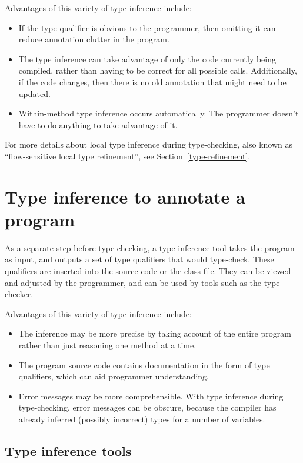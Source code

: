 Advantages of this variety of type inference include:
\begin{itemize}
\item
  If the type qualifier is obvious to the programmer, then omitting it
  can reduce annotation clutter in the program.
\item
  The type inference can take advantage of only the code currently being
  compiled, rather than having to be correct for all possible calls.
  Additionally, if the code changes, then there is no old annotation that
  might need to be updated.
\item
  Within-method type inference occurs automatically.
  The programmer doesn't have to do anything to take advantage of it.
\end{itemize}

For more details about local type inference during type-checking, also
known as ``flow-sensitive local type refinement'', see
Section~\ref{type-refinement}.


\section{Type inference to annotate a program\label{type-inference-to-annotate}}

As a separate step before type-checking, a type inference tool takes the
program as input, and outputs a set of type qualifiers that would
type-check.  These qualifiers are inserted into the source code or the
class file.  They can be viewed and adjusted by the programmer, and can
be used by tools such as the type-checker.

Advantages of this variety of type inference include:
\begin{itemize}
\item
  The inference may be more precise by taking account of the entire program
  rather than just reasoning one method at a time.
\item
  The program source code contains documentation in the form of type
  qualifiers, which can aid programmer understanding.
\item
  Error messages may be more comprehensible.  With type inference
  during type-checking, error messages can be obscure, because the
  compiler has already inferred (possibly incorrect) types for a number
  of variables.
\end{itemize}


\subsection{Type inference tools\label{type-inference-tools}}

